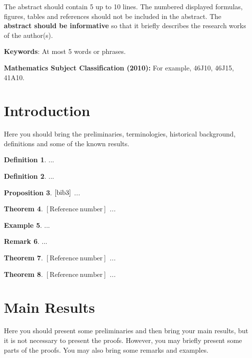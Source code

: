 \documentclass[a0,12pt,portrait]{a0poster}
\newtheorem{theorem}{Theorem}[section]
\newtheorem{proposition}[theorem]{Proposition}
\theoremstyle{definition}
\newtheorem{definition}[theorem]{Definition}
\newtheorem{example}[theorem]{Example}
\newtheorem{remark}[theorem]{Remark}
\numberwithin{equation}{section}
\begin{document}
\huge
The abstract should  contain 5 up to 10 lines. The numbered displayed formulas, figures, tables and references
should not be included in the abstract. The \textbf{abstract should be informative} so that it briefly describes
the research works of the author(s).
\begin{multicols}{2}
\noindent \textbf{Keywords}: At most 5 words or phrases.

\noindent\textbf{Mathematics Subject Classification (2010):} For example, 46J10, 46J15, 41A10.

\section{\LARGE Introduction} 
Here you should bring the preliminaries, terminologies,
 historical background, definitions and some of the known results.

\begin{definition} 
 ...
\end{definition}
\begin{definition}
...
\end{definition}
\begin{proposition}$\mathrm{\cite[Theorem~A]{bib3}}$
...
\end{proposition}
\begin{theorem}$\mathrm{[Reference~ number]}$
...
\end{theorem}
\begin{example}
...
\end{example}
\begin{remark}
...
\end{remark}
\begin{theorem}$\mathrm{[Reference~ number]}$
...
\end{theorem}
\begin{theorem}$\mathrm{[Reference~ number]}$
...
\end{theorem}

\section{\LARGE Main Results}
Here you should present some preliminaries and then bring your main results, but it is not necessary to present the proofs.
 However, you may briefly present some parts of the proofs.
You may also bring some remarks and examples.


\end{multicols}
\end{document}
